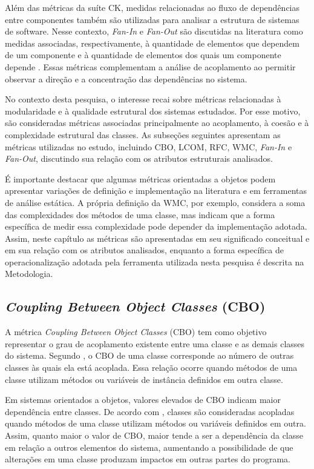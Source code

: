 Além das métricas da suíte CK, medidas relacionadas ao fluxo de dependências entre componentes também são utilizadas para analisar 
a estrutura de sistemas de software. Nesse contexto, \textit{Fan-In} e \textit{Fan-Out} são discutidas na literatura como medidas associadas, 
respectivamente, à quantidade de elementos que dependem de um componente e à quantidade de elementos dos quais um componente 
depende \cite{yourdon1978,sommerville2011}. Essas métricas complementam a análise de acoplamento ao permitir observar a direção 
e a concentração das dependências no sistema.

No contexto desta pesquisa, o interesse recai sobre métricas relacionadas à modularidade e à qualidade estrutural dos sistemas 
estudados. Por esse motivo, são consideradas métricas associadas principalmente ao acoplamento, à coesão e à complexidade 
estrutural das classes. As subseções seguintes apresentam as métricas utilizadas no estudo, incluindo CBO, LCOM, RFC, WMC, 
\textit{Fan-In} e \textit{Fan-Out}, discutindo sua relação com os atributos estruturais analisados.

É importante destacar que algumas métricas orientadas a objetos podem apresentar variações de definição e implementação na 
literatura e em ferramentas de análise estática. A própria definição da WMC, por exemplo, considera a soma das complexidades 
dos métodos de uma classe, mas  indicam que a forma específica de medir essa complexidade pode 
depender da implementação adotada. Assim, neste capítulo as métricas são apresentadas em seu significado conceitual e em 
sua relação com os atributos analisados, enquanto a forma específica de operacionalização adotada pela ferramenta utilizada 
nesta pesquisa é descrita na Metodologia.

\subsection{\textit{Coupling Between Object Classes} (CBO)}
\label{sec:cbo}

A métrica \textit{Coupling Between Object Classes} (CBO) tem como objetivo representar o grau 
de acoplamento existente entre uma classe e as demais classes do sistema. Segundo , o CBO de uma classe 
corresponde ao número de outras classes às quais ela está acoplada. Essa relação ocorre quando métodos de uma classe utilizam métodos 
ou variáveis de instância definidos em outra classe.

Em sistemas orientados a objetos, valores elevados de CBO indicam maior dependência entre classes. De acordo com 
, classes são consideradas acopladas quando métodos de uma classe utilizam métodos ou 
variáveis definidos em outra. Assim, quanto maior o valor de CBO, maior tende a ser a dependência da classe em relação 
a outros elementos do sistema, aumentando a possibilidade de que alterações em uma classe produzam impactos em outras partes 
do programa.

